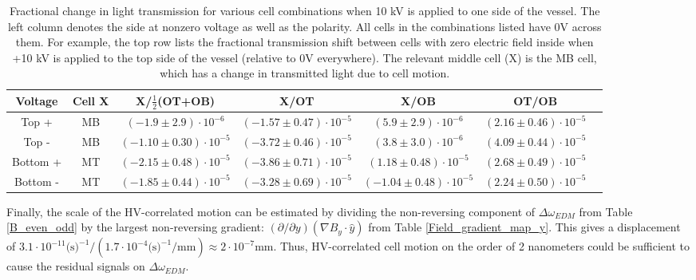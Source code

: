 \documentclass [10pt, twoside] {uwthesis}[2012/04/02]
\begin{document}
\begin{table}	
\footnotesize
\begin{center}																					
\caption[Fractional transmission change with voltage for cells with $\mathbf {E}=0$] 
{\narrower Fractional change in light transmission for various cell combinations when 10 kV is applied to one side of the vessel. The left column denotes the side at nonzero voltage as well as the polarity. All cells in the combinations listed have 0V across them. For example, the top row lists the fractional transmission shift between cells with zero electric field inside when +10 kV is applied to the top side of the vessel (relative to 0V everywhere). The relevant middle cell (X) is the MB cell, which has a change in transmitted light due to cell motion.}
\begin{tabular}{ccccccc}												
\hline \hline								
Voltage    & Cell X &     X/$\frac{1}{2}$(OT+OB)  &              X/OT            &              X/OB            &             OT/OB           \\ \hline
 Top +     &   MB   & $ (-1.9\pm 2.9)\cdot10^{-6}$ & $(-1.57\pm0.47)\cdot10^{-5}$ & $  (5.9\pm 2.9)\cdot10^{-6}$ & $(2.16\pm0.46)\cdot10^{-5}$ \\
 Top -     &   MB   & $(-1.10\pm0.30)\cdot10^{-5}$ & $(-3.72\pm0.46)\cdot10^{-5}$ & $  (3.8\pm 3.0)\cdot10^{-6}$ & $(4.09\pm0.44)\cdot10^{-5}$ \\
 Bottom +  &   MT   & $(-2.15\pm0.48)\cdot10^{-5}$ & $(-3.86\pm0.71)\cdot10^{-5}$ & $ (1.18\pm0.48)\cdot10^{-5}$ & $(2.68\pm0.49)\cdot10^{-5}$ \\
 Bottom -  &   MT   & $(-1.85\pm0.44)\cdot10^{-5}$ & $(-3.28\pm0.69)\cdot10^{-5}$ & $(-1.04\pm0.48)\cdot10^{-5}$ & $(2.24\pm0.50)\cdot10^{-5}$ \\ \hline
\end{tabular} 
\label{Stark_shift_1_side} 									
\end{center}
\end{table}

Finally, the scale of the HV-correlated motion can be estimated by dividing the non-reversing component of $\Delta\omega_{EDM}$ from Table \ref{B_even_odd} by the largest non-reversing gradient: $(\partial/\partial y)(\nabla B_y\cdot\hat{y})$ from Table \ref{Field_gradient_map_y}. This gives a displacement of $3.1\cdot10^{-11} \text{(s)}^{-1} /( 1.7 \cdot 10^{-4} \text{(s)}^{-1}\text{/mm}) \approx 2\cdot10^{-7} \text{mm}$. Thus, HV-correlated cell motion on the order of 2 nanometers could be sufficient to cause the residual signals on $\Delta\omega_{EDM}.$
\end{document}
